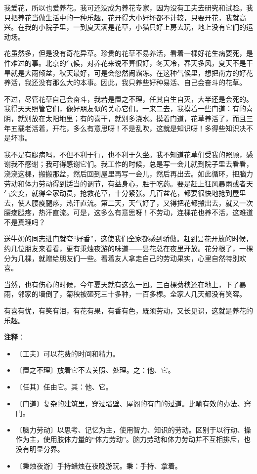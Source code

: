 \documentclass[12pt,UTF-8,openany]{ctexbook}
\begin{document}
\begin{Large}
    
    我爱花，所以也爱养花。我可还没成为养花专家，因为没有工夫去研究和试验。我只把养花当做生活中的一种乐趣，花开得大小好坏都不计较，只要开花，我就高兴。在我的小院子里，一到夏天满是花草，小猫只好上房去玩，地上没有它们的运动场。
    
    花虽然多，但是没有奇花异草。珍贵的花草不易养活，看着一棵好花生病要死，是件难过的事。北京的气候，对养花来说不算很好，冬天冷，春天多风，夏天不是干旱就是大雨倾盆，秋天最好，可是会忽然闹霜冻。在这种气候里，想把南方的好花养活，我还没有那么大的本事。因此，我只养些好种易活、自己会奋斗的花草。
    
    不过，尽管花草自己会奋斗，我若是置之不理，任其自生自灭，大半还是会死的。我得天天照管它们，像好朋友似的关心它们。一来二去，我摸着一些门道：有的喜阴，就别放在太阳地里；有的喜干，就别多浇水。摸着门道，花草养活了，而且三年五载老活着，开花，多么有意思呀！不是乱吹，这就是知识呀！多得些知识决不是坏事。
    
    我不是有腿病吗，不但不利于行，也不利于久坐。我不知道花草们受我的照顾，感谢我不感谢；我可得感谢它们。我工作的时候，总是写一会儿就到院子里去看看，浇浇这棵，搬搬那盆，然后回到屋里再写一会儿，然后再出去。如此循环，把脑力劳动和体力劳动得到适当的调节，有益身心，胜于吃药。要是赶上狂风暴雨或者天气突变，就得全家动员，抢救花草，十分紧张。几百盆花，都要很快地抢到屋里去，使人腰痠腿疼，热汗直流。第二天，天气好了，又得把花都搬出去，就又一次腰痠腿疼，热汗直流。可是，这多么有意思呀！不劳动，连棵花也养不活，这难道不是真理吗？
    
    送牛奶的同志进门就夸“好香”，这使我们全家都感到骄傲。赶到昙花开放的时候，约几位朋友来看看，更有秉烛夜游的味道——昙花总在夜里开放。花分根了，一棵分为几棵，就赠给朋友们一些。看着友人拿走自己的劳动果实，心里自然特别欢喜。
    
    当然，也有伤心的时候，今年夏天就有这么一回。三百棵菊秧还在地上，下了暴雨，邻家的墙倒了，菊秧被砸死三十多种，一百多棵。全家人几天都没有笑容。
    
    有喜有忧，有笑有泪，有花有果，有香有色，既须劳动，又长见识，这就是养花的乐趣。
    
\end{Large}


\newpage

\textbf{注释}：

\vspace{-1em}

\begin{itemize}
    \setlength\itemsep{-0.2em}
    \item 〔工夫〕可以花费的时间和精力。
    \item 〔置之不理〕放着它不去关照、处理。之：他、它。
    \item 〔任其〕任由它。其：他、它。
    \item 〔门道〕复杂的建筑里，穿过墙壁、屋阁的有门的过道。比喻有效的办法、窍门。
    \item 〔脑力劳动〕以思考、记忆为主，使用智力、知识的劳动。区别于以行动、操作为主，使用肢体力量的“体力劳动”。脑力劳动和体力劳动并不互相排斥，也没有明显分界。
    \item 〔秉烛夜游〕手持蜡烛在夜晚游玩。秉：手持、拿着。
\end{itemize}
\end{document}
